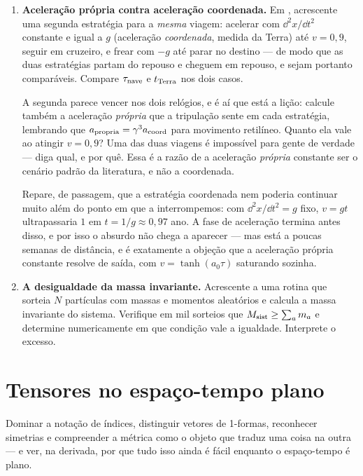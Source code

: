 \documentclass[12pt,a4paper,oneside]{book}
\theoremstyle{rgplain}
\theoremstyle{rgremark}
\begin{document}
\begin{enumerate}
  \item \textbf{Aceleração própria contra aceleração coordenada.} Em
, acrescente uma segunda estratégia para a
\emph{mesma} viagem: acelerar com $\dd^2x/\dd t^2$ constante e igual a $g$
(aceleração \emph{coordenada}, medida da Terra) até $v=0{,}9$, seguir em
cruzeiro, e frear com $-g$ até parar no destino --- de modo que as duas
estratégias partam do repouso e cheguem em repouso, e sejam portanto
comparáveis. Compare $\tau_{\rm nave}$ e $t_{\rm Terra}$ nos dois casos.

  A segunda parece vencer nos dois relógios, e é aí que está a lição:
calcule também a aceleração \emph{própria} que a tripulação sente em cada
estratégia, lembrando que $a_{\rm propria}=\gamma^3 a_{\rm coord}$ para
movimento retilíneo. Quanto ela vale ao atingir $v=0{,}9$? Uma das duas
viagens é impossível para gente de verdade --- diga qual, e por quê. Essa é
a razão de a aceleração \emph{própria} constante ser o cenário padrão da
literatura, e não a coordenada.

  Repare, de passagem, que a estratégia coordenada nem poderia continuar muito
além do ponto em que a interrompemos: com $\dd^2x/\dd t^2=g$ fixo, $v=gt$
ultrapassaria $1$ em $t=1/g\approx0{,}97$ ano. A fase de aceleração termina
antes disso, e por isso o absurdo não chega a aparecer --- mas está a poucas
semanas de distância, e é exatamente a objeção que a aceleração própria
constante resolve de saída, com $v=\tanh(a_0\tau)$ saturando sozinha.

  \item \textbf{A desigualdade da massa invariante.} Acrescente a
 uma rotina que sorteia $N$ partículas com
massas e momentos aleatórios e calcula a massa invariante do sistema.
Verifique em mil sorteios que $M_{\rm sist}\ge\sum_a m_a$ e determine
numericamente em que condição vale a igualdade. Interprete o excesso.
\end{enumerate}


\chapter{Tensores no espaço-tempo plano}
\label{chap:tensores}
\label{cap:tensores-plano}

\begin{objetivos}
Dominar a notação de índices, distinguir vetores de 1-formas, reconhecer
simetrias e compreender a métrica como o objeto que traduz uma coisa na outra
--- e ver, na derivada, por que tudo isso ainda é fácil enquanto o
espaço-tempo é plano.
\end{objetivos}
\end{document}
